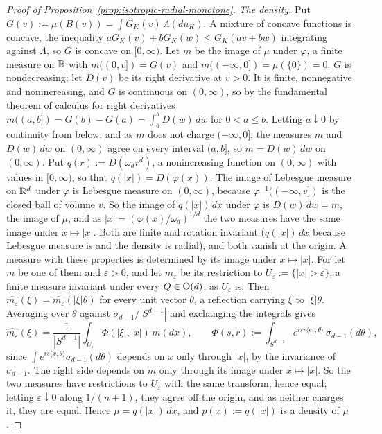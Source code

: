 \begin{proof}[Proof of Proposition~\ref{prop:isotropic-radial-monotone}]
\emph{The density.} Put $G(v) := \mu(B(v)) = \int G_K(v)\,\Lambda(du_K)$. A mixture of concave
functions is concave, the inequality $aG_K(v) + bG_K(w) \le G_K(av + bw)$ integrating against
$\Lambda$, so $G$ is concave on $[0,\infty)$. Let $m$ be the image of $\mu$ under $\varphi$, a
finite measure on $\mathbb{R}$ with $m((0,v]) = G(v)$ and $m((-\infty,0]) = \mu(\{0\}) = 0$. $G$ is
nondecreasing; let $D(v)$ be its right derivative at $v > 0$. It is finite, nonnegative and
nonincreasing, and $G$ is continuous on $(0,\infty)$, so by the fundamental theorem of calculus
for right derivatives $m((a,b]) = G(b) - G(a) = \int_a^b D(w)\,dw$ for $0 < a \le b$. Letting
$a \downarrow 0$ by continuity from below, and as $m$ does not charge $(-\infty,0]$, the measures
$m$ and $D(w)\,dw$ on $(0,\infty)$ agree on every interval $(a,b]$, so $m = D(w)\,dw$ on
$(0,\infty)$. Put $q(r) := D(\omega_d r^d)$, a nonincreasing function on $(0,\infty)$ with values
in $[0,\infty)$, so that $q(|x|) = D(\varphi(x))$. The image of Lebesgue measure on $\mathbb{R}^d$ under
$\varphi$ is Lebesgue measure on $(0,\infty)$, because $\varphi^{-1}((-\infty,v])$ is the closed
ball of volume $v$. So the image of $q(|x|)\,dx$ under $\varphi$ is $D(w)\,dw = m$, the image of
$\mu$, and as $|x| = (\varphi(x)/\omega_d)^{1/d}$ the two measures have the same image under
$x \mapsto |x|$. Both are finite and rotation invariant ($q(|x|)\,dx$ because Lebesgue measure is and
the density is radial), and both vanish at the origin. A measure with these properties is
determined by its image under $x \mapsto |x|$. For let $m$ be one of them and
$\varepsilon > 0$, and let $m_\varepsilon$ be its restriction to
$U_\varepsilon := \{|x| > \varepsilon\}$, a finite measure invariant under every $Q \in \mathrm{O}(d)$,
as $U_\varepsilon$ is. Then $\widehat{m_\varepsilon}(\xi) = \widehat{m_\varepsilon}(|\xi|\theta)$
for every unit vector $\theta$, a reflection carrying $\xi$ to $|\xi|\theta$. Averaging over
$\theta$ against $\sigma_{d-1}/|S^{d-1}|$ and exchanging the integrals gives
\[
  \widehat{m_\varepsilon}(\xi)
   = \frac{1}{|S^{d-1}|}\int_{U_\varepsilon}\Phi(|\xi|,|x|)\,m(dx) ,
  \qquad
  \Phi(s,r) := \int_{S^{d-1}} e^{i s r\langle e_1,\theta\rangle}\,\sigma_{d-1}(d\theta) ,
\]
since $\int e^{i s\langle x,\theta\rangle}\sigma_{d-1}(d\theta)$ depends on $x$ only through $|x|$,
by the invariance of $\sigma_{d-1}$. The right side depends on $m$ only through its image under
$x \mapsto |x|$. So the two measures have restrictions to $U_\varepsilon$ with the same transform,
hence equal; letting $\varepsilon \downarrow 0$ along $1/(n+1)$, they agree off the origin, and as
neither charges it, they are equal. Hence $\mu = q(|x|)\,dx$, and $p(x) := q(|x|)$ is a density of
$\mu$.


\end{proof}
